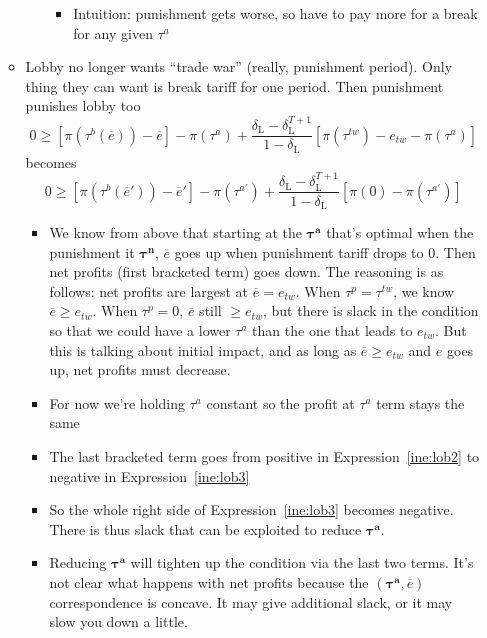 \documentclass[12pt]{article}
\newcommand{\ov}{\overline}
\newcommand{\bta}{\bm{\tau^a}}
\newcommand{\btn}{\bm{\tau^n}}
\newcommand{\de}{\delta}
\begin{document}
\begin{itemize}
\begin{itemize}
\begin{itemize}
\begin{itemize}
								\item Intuition: punishment gets worse, so have to pay more for a break for any given $\tau^a$
							\end{itemize}
				\end{itemize}
			\item Lobby no longer wants ``trade war'' (really, punishment period). Only thing they can want is break tariff for one period. Then punishment punishes lobby too
			  \begin{equation}
					0 \geq \left[\pi(\tau^b(\ov{e})) - \ov{e}\right] - \pi(\tau^a) + \frac{\de_\text{L} - \de_\text{L}^{T+1}}{1-\de_\text{L}} \left[\pi(\tau^{tw}) -e_{tw} - \pi(\tau^a) \right]
					\label{ine:lob2}
				\end{equation}
becomes
				\begin{equation}
					0 \geq \left[\pi(\tau^b(\ov{e}')) - \ov{e}'\right] - \pi(\tau^{a'}) + \frac{\de_\text{L} - \de_\text{L}^{T+1}}{1-\de_\text{L}} \left[\pi(0) - \pi(\tau^{a'}) \right]
					\label{ine:lob3}
				\end{equation}
				\begin{itemize}
					\item We know from above that starting at the $\bta$ that's optimal when the punishment it $\btn$, $\ov{e}$ goes up when punishment tariff drops to 0. Then net profits (first bracketed term) goes down. The reasoning is as follows: net profits are largest at $\ov{e} = e_{tw}$. When $\tau^p = \tau^{tw}$, we know $\ov{e} \geq e_{tw}$. When $\tau^p = 0$, $\ov{e}$ still $\geq e_{tw}$, but there is slack in the condition so that we could have a lower $\tau^a$ than the one that leads to $e_{tw}$. But this is talking about initial impact, and as long as $\ov{e} \geq e_{tw}$ and $e$ goes up, net profits must decrease.
					\item For now we're holding $\tau^a$ constant so the profit at $\tau^a$ term stays the same
					\item The last bracketed term goes from positive in Expression~\ref{ine:lob2} to negative in Expression~\ref{ine:lob3}
					\item So the whole right side of Expression~\ref{ine:lob3} becomes negative. There is thus slack that can be exploited to reduce $\bta$.
					\item Reducing $\bta$ will tighten up the condition via the last two terms. It's not clear what happens with net profits because the $\left(\bta,\ov{e}\right)$ correspondence is concave. It may give additional slack, or it may slow you down a little.

\end{itemize}
\end{itemize}
\end{itemize}
\end{document}
